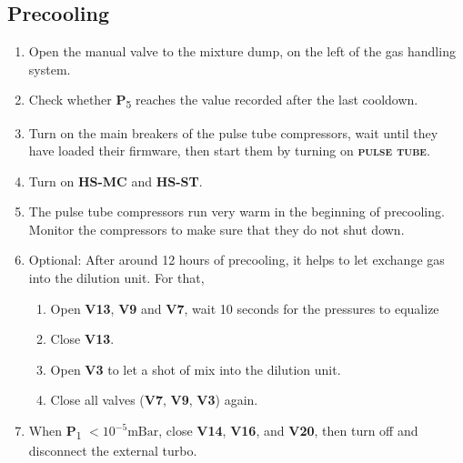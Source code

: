 \documentclass{article}[18pt,A4]
\newcommand{\mBar}{\mathrm{mBar}}
\newcommand{\thing}[1]{{\color{gray}\textsc{ \textbf{#1}}}}
\newcommand{\valve}[1]{{\color{gray}\textbf{V#1}}}
\newcommand{\pressure}[1]{{\color{pressurecolor}\textbf{P}\textsubscript{#1}}}
\begin{document}
\subsection{Precooling}
\begin{enumerate}
    \item Open the manual valve to the mixture dump, on the left of the gas handling system. 
    \item Check whether \pressure{5} reaches the value recorded after the last cooldown.
    \item Turn on the main breakers of the pulse tube compressors, wait until they have loaded their firmware, then start them by turning on \thing{pulse tube}.
    \item Turn on \thing{HS-MC} and \thing{HS-ST}.
    \item The pulse tube compressors run very warm in the beginning of precooling.
    Monitor the compressors to make sure that they do not shut down. 
    \item Optional: After around 12 hours of precooling, it helps to let exchange gas into the dilution unit. For that, 
        \begin{enumerate}
        \item Open \valve{13}, \valve{9} and \valve{7}, wait 10 seconds for the pressures to equalize
        \item Close \valve{13}. 
        \item Open \valve{3} to let a shot of mix into the dilution unit.
        \item Close all valves (\valve{7}, \valve{9}, \valve{3}) again.
        \end{enumerate}
    \item When \pressure{1} $< 10^{-5} \mBar$, close \valve{14}, \valve{16}, and \valve{20}, then turn off and
disconnect the external turbo.
\end{enumerate}
\end{document}
